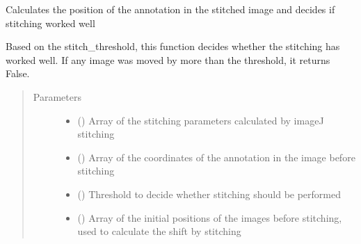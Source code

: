 \documentclass[letterpaper,10pt,english]{sphinxmanual}
\begin{document}
\begin{fulllineitems}
\begin{fulllineitems}
\begin{quote}
\begin{description}
\end{description}\end{quote}

\end{fulllineitems}


\begin{fulllineitems}
\label{\detokenize{index:stitch_MAPS_annotations.Stitcher.process_stitching_params}}
Calculates the position of the annotation in the stitched image and decides if stitching worked well

Based on the stitch\_threshold, this function decides whether the stitching has worked well. If any image was
moved by more than the threshold, it returns False.
\begin{quote}\begin{description}
\item[{Parameters}] \leavevmode\begin{itemize}
\item {} 
 () \textendash{} Array of the stitching parameters calculated by imageJ stitching

\item {} 
 () \textendash{} Array of the coordinates of the annotation in the image before stitching

\item {} 
 () \textendash{} Threshold to decide whether stitching should be performed

\item {} 
 () \textendash{} Array of the initial positions of the images before stitching, used to
calculate the shift by stitching


\end{itemize}
\end{description}
\end{quote}
\end{fulllineitems}
\end{fulllineitems}
\end{document}

